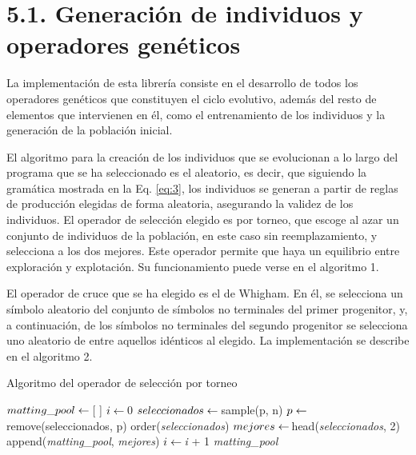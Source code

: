 \documentclass[spanish,a4paper,12pt,twoside]{report}
\begin{document}
  \section*{\Large 5.1. Generación de individuos y operadores genéticos}
  La implementación de esta librería consiste en el desarrollo de todos los operadores genéticos que constituyen el ciclo evolutivo, además del resto de elementos que intervienen en él, como el entrenamiento de los individuos y la generación de la población inicial.  \par
  El algoritmo para la creación de los individuos que se evolucionan a lo largo del programa que se ha seleccionado es el aleatorio, es decir, que siguiendo la gramática mostrada en la Eq. \ref{eq:3}, los individuos se generan a partir de reglas de producción elegidas de forma aleatoria, asegurando la validez de los individuos. \vfill
  El operador de selección elegido es por torneo, que escoge al azar un conjunto de individuos de la población, en este caso sin reemplazamiento, y selecciona a los dos mejores. Este operador permite que haya un equilibrio entre exploración y explotación. Su funcionamiento puede verse en el algoritmo 1. \par\par
  El operador de cruce que se ha elegido es el de Whigham. En él, se selecciona un símbolo aleatorio del conjunto de símbolos no terminales del primer progenitor, y, a continuación, de los símbolos no terminales del segundo progenitor se selecciona uno aleatorio de entre aquellos idénticos al elegido. La implementación se describe en el algoritmo 2. \par
  \begin{algorithm}[H]
    \caption{Algoritmo del operador de selección por torneo}\label{selop}
    \begin{algorithmic}[1]
       
        \State $matting\_pool \gets \thinspace $[ ]
        \State $i \gets \thinspace $0
          \State $seleccionados \gets \thinspace $sample(p, n)
          \State $p \gets \thinspace $remove(seleccionados, p)
          \State order(\textit{seleccionados})
          \State $mejores \gets \thinspace $head(\textit{seleccionados}, 2)
          \State append(\textit{matting\_pool}, \textit{mejores})
          \State $i \gets \thinspace $\textit{i} + 1
        \EndWhile
        \State \Return \textit{matting\_pool}
      \EndFunction
    \end{algorithmic}
  \end{algorithm} 
\end{document}
